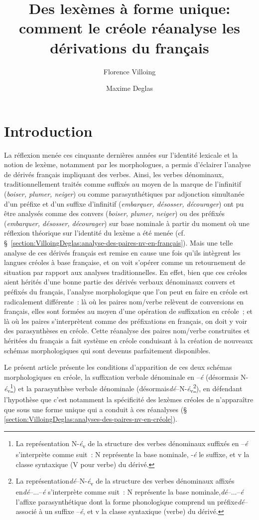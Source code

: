 \documentclass[output=paper]{langsci/langscibook}
\title{Des lexèmes à forme unique: comment le créole réanalyse les dérivations
du français}
\author{%
Florence Villoing \affiliation{Modèles, Dynamiques, Corpus~ (MoDyCo) CNRS~:
UMR7114,~Université Paris Nanterre}%
\and
Maxime Deglas \affiliation{Structures Formelles du Langage~ (SFL), CNRS~:
UMR7023,~Université Paris VIII - Vincennes Saint-Denis}%
}
\begin{document}


\section{Introduction}\label{section:VilloingDeglas:introduction}

La réflexion menée ces cinquante dernières années sur l'identité
lexicale et la notion de lexème, notamment par les morphologues, a
permis d'éclairer l'analyse de dérivés français impliquant des verbes.
Ainsi, les verbes dénominaux, traditionnellement traités comme suffixés
au moyen de la marque de l'infinitif (\emph{boiser, plumer, neiger}) ou
comme parasynthétiques par adjonction simultanée d'un préfixe et d'un
suffixe d'infinitif (\emph{embarquer, désosser, décourager}) ont pu être
analysés comme des convers (\emph{boiser, plumer, neiger}) ou des
préfixés (\emph{embarquer, désosser, décourager}) sur base nominale à
partir du moment où une réflexion théorique sur l'identité du lexème a
été menée (cf. §~\ref{section:VilloingDeglas:analyse-des-paires-nv-en-français}). Mais une telle analyse de ces dérivés français est
remise en cause une fois qu'ils intègrent les langues créoles à base
française, et on voit s'opérer comme un retournement de situation par
rapport aux analyses traditionnelles. En effet, bien que ces créoles
aient hérités d'une bonne partie des dérivés verbaux dénominaux convers
et préfixés du français, l'analyse morphologique que l'on peut en faire
en créole est radicalement différente~: là où les paires nom/verbe
relèvent de conversions en français, elles sont formées au moyen d'une
opération de suffixation en créole~; et là où les paires s'interprètent
comme des préfixations en français, on doit y voir des parasynthèses en
créole. Cette réanalyse des paires nom/verbe construites et héritées du
français a fait système en créole conduisant à la création de nouveaux
schémas morphologiques qui sont devenus parfaitement disponibles.

Le présent article présente les conditions d'apparition de ces deux
schémas morphologiques en créole, la suffixation verbale dénominale en
--\emph{é} (désormais N-\emph{é}\textsubscript{v}\footnote{La
  représentation N-\emph{é}\textsubscript{v} de la structure des verbes
  dénominaux suffixés en --\emph{é} s'interprète comme suit~: N
  représente la base nominale, -\emph{é} le suffixe, et v la classe syntaxique
  (V pour verbe) du dérivé. }) et la parasynthèse verbale dénominale
(désormais\emph{dé}--N-\emph{é}\textsubscript{v}\footnote{La
  représentation\emph{dé}--N-\emph{é}\textsubscript{v} de la structure des verbes
  dénominaux affixés en\emph{dé}--...--\emph{é} s'interprète comme suit~: N
  représente la base nominale,\emph{dé}--...--\emph{é} l'affixe parasynthétique dont la
  forme phonologique comprend un préfixe\emph{dé}-- associé à un suffixe --\emph{é}, et
  v la classe syntaxique (verbe) du dérivé. }), en défendant
l'hypothèse que c'est notamment la spécificité des lexèmes créoles de
n'apparaître que sous une forme unique qui a conduit à ces réanalyses (§
\ref{section:VilloingDeglas:analyses-des-paires-nv-en-créole}).
\end{document}
